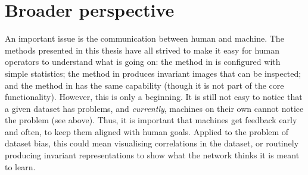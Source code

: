 \section{Broader perspective}\label{sec:broader-perspective}
%
An important issue is the communication between human and machine.
The methods presented in this thesis have all strived to make it easy for human operators to understand what is going on:
the method in  is configured with simple statistics;
the method in  produces invariant images that can be inspected;
and the method in  has the same capability
(though it is not part of the core functionality).
However, this is only a beginning.
It is still not easy to notice that a given dataset has problems,
and \emph{currently}, machines on their own cannot notice the problem (see above).
Thus, it is important that machines get feedback early and often,
to keep them aligned with human goals.
Applied to the problem of dataset bias,
this could mean visualising correlations in the dataset,
or routinely producing invariant representations to show what the network thinks it is meant to learn.

